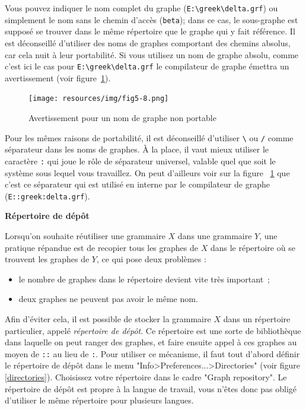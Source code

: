 \noindent Vous pouvez indiquer le nom complet du graphe
(\verb$E:\greek\delta.grf$) ou simplement le nom sans le chemin d’accès
 (\verb$beta$); dans ce cas, le sous-graphe est supposé se
trouver dans le même répertoire que le graphe qui y fait référence. Il est déconseillé d’utiliser 
des noms de graphes comportant des chemins absolus, car cela nuit à leur portabilité. Si
vous utilisez un nom de graphe absolu, comme c’est ici le cas pour \verb+E:\greek\delta.grf+
le compilateur de graphe émettra un avertissement (voir
figure~\ref{fig-warning-absolute-graph-name}).

\begin{figure}[!ht]
\begin{center}
\texttt{[image: resources/img/fig5-8.png]}
\caption{Avertissement pour un nom de graphe non portable\label{fig-warning-absolute-graph-name}}
\end{center}
\end{figure}

\bigskip
\noindent Pour les mêmes raisons de portabilité, il est déconseillé d’utiliser \verb+\+
ou \verb+/+ comme séparateur dans les noms de graphes. À la place, il vaut mieux utiliser
le caractère \verb+:+ qui joue le rôle de séparateur universel, valable quel que soit le système 
sous lequel vous travaillez. On peut d’ailleurs voir sur la figure
~\ref{fig-warning-absolute-graph-name}
que c’est ce séparateur qui est utilisé en interne par le compilateur de graphe
(\verb+E::greek:delta.grf+).

\bigskip
\noindent \textbf{Répertoire de dépôt}
\label{section-repository}

\bigskip
\noindent Lorsqu’on souhaite réutiliser une grammaire $X$ dans une grammaire $Y$, une pratique
répandue est de recopier tous les graphes de $X$ dans le répertoire où se trouvent les graphes
de $Y$, ce qui pose deux problèmes :

\begin{itemize}
  \item le nombre de graphes dans le répertoire devient vite très important~;
  \item deux graphes ne peuvent pas avoir le même nom.
\end{itemize}

\noindent Afin d’éviter cela, il est possible de stocker la grammaire $X$ dans un répertoire
particulier, appelé \textit{répertoire de dépôt}. Ce répertoire est
une sorte de bibliothèque dans laquelle on peut ranger des graphes, et faire ensuite appel
à ces graphes au moyen de \verb+::+  au lieu de \verb+:+. Pour utiliser ce mécanisme, il faut tout
d’abord définir le répertoire de dépôt dans le menu "Info>Preferences...>Directories" (voir figure
	\ref{directories}).
Choisissez votre répertoire dans le cadre "Graph repository". Le répertoire de dépôt est propre
à la langue de travail, vous n’êtes donc pas obligé d’utiliser le même répertoire pour plusieurs
langues.

